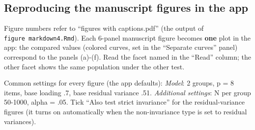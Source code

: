 \documentclass[
]{article}
\newenvironment{Shaded}{\begin{snugshade}}{\end{snugshade}}
\newcommand{\AttributeTok}[1]{\textcolor[rgb]{0.13,0.29,0.53}{#1}}
\newcommand{\CommentTok}[1]{\textcolor[rgb]{0.56,0.35,0.01}{\textit{#1}}}
\newcommand{\ConstantTok}[1]{\textcolor[rgb]{0.56,0.35,0.01}{#1}}
\newcommand{\DecValTok}[1]{\textcolor[rgb]{0.00,0.00,0.81}{#1}}
\newcommand{\FunctionTok}[1]{\textcolor[rgb]{0.13,0.29,0.53}{\textbf{#1}}}
\newcommand{\NormalTok}[1]{#1}
\newcommand{\OtherTok}[1]{\textcolor[rgb]{0.56,0.35,0.01}{#1}}
\newcommand{\SpecialCharTok}[1]{\textcolor[rgb]{0.81,0.36,0.00}{\textbf{#1}}}
\newcommand{\StringTok}[1]{\textcolor[rgb]{0.31,0.60,0.02}{#1}}
\begin{document}
\begin{Shaded}
\end{Shaded}

\subsection{Reproducing the manuscript figures in the
app}\label{reproducing-the-manuscript-figures-in-the-app}

Figure numbers refer to ``figures with captions.pdf'' (the output of
\texttt{figure\ markdown4.Rmd}). Each 6-panel manuscript figure becomes
\textbf{one} plot in the app: the compared values (colored curves, set
in the ``Separate curves'' panel) correspond to the panels (a)-(f). Read
the facet named in the ``Read'' column; the other facet shows the same
population under the other test.

Common settings for every figure (the app defaults): \emph{Model}: 2
groups, p = 8 items, base loading .7, base residual variance .51.
\emph{Additional settings}: N per group 50-1000, alpha = .05. Tick
``Also test strict invariance'' for the residual-variance figures (it
turns on automatically when the non-invariance type is set to residual
variances).
\end{document}
